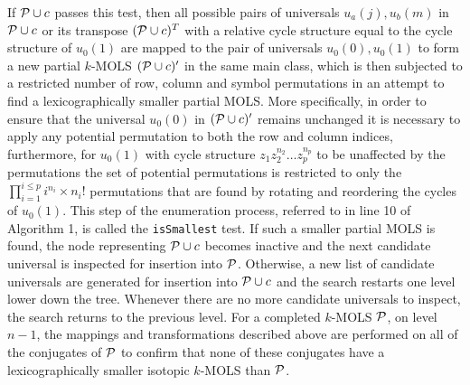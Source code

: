 If  $\mathcal{P} \cup c$ passes this test, then  all possible pairs of universals  $u_a{(j)}, u_{b}{(m)}$ in $ \mathcal{P} \cup c$ or its transpose  $(\mathcal{P} \cup c)^T$  with a relative cycle structure equal to the cycle structure of $u_0{(1)}$ are mapped to the pair of universals $u_0{(0)}, u_{0}{(1)}$ to form a new partial $k$-MOLS $(\mathcal{P} \cup c)'$ in the same main class, which is then subjected to a restricted number of row, column and symbol permutations in an attempt to find a lexicographically smaller partial MOLS. 
More specifically, in order to ensure that the universal  $u_0(0)$  in $(\mathcal{P} \cup c)'$ remains unchanged it is necessary to apply any potential permutation to both the row and column indices, furthermore, for $u_0(1)$ with cycle structure $z_1  z_{2}^{n_2} \ldots z_{p}^{n_p} $ to be unaffected by the permutations the set of potential permutations is restricted to only the $\prod_{i=1}^{i\leq p} i ^{n_i} \times n_i!$ permutations that are found by rotating and reordering the cycles of  $u_0(1)$. This step of the enumeration process, referred to in line 10 of   Algorithm 1, is called the \texttt{isSmallest} test.
If such a smaller partial MOLS is found, the node representing $\mathcal{P} \cup c$ becomes inactive and the next candidate universal is inspected for insertion into $\mathcal{P}$. Otherwise, a new list of candidate universals are generated for insertion into $\mathcal{P} \cup c$ and the search restarts one level lower down  the tree. Whenever there are no more candidate universals to inspect, the search returns to the previous level.  
For a completed $k$-MOLS $\mathcal{P}$, on  level $n-1$, the mappings and transformations described above are performed on all of the conjugates of $\mathcal{P}$ to confirm that none of these conjugates have a lexicographically smaller isotopic $k$-MOLS than $\mathcal{P}$. 


